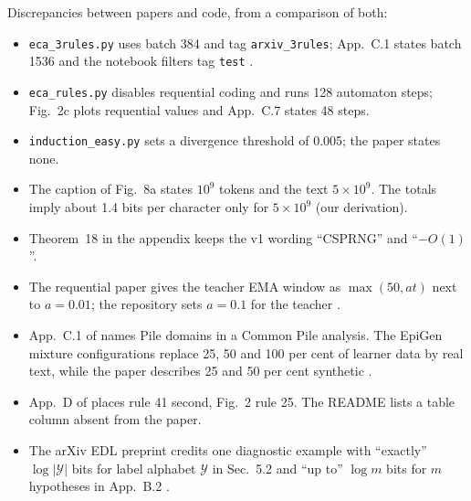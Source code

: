 \documentclass[11pt]{article}
\theoremstyle{tight}
\begin{document}
Discrepancies between papers and code, from a comparison of both:
\begin{itemize}
\item \texttt{eca\_3rules.py} uses batch 384 and tag \texttt{arxiv\_3rules}; App.~C.1 states batch
1536 and the notebook filters tag \texttt{test} \citep{epiplexitycode}.
\item \texttt{eca\_rules.py} disables requential coding and runs 128 automaton steps; Fig.~2c plots
requential values and App.~C.7 states 48 steps.
\item \texttt{induction\_easy.py} sets a divergence threshold of 0.005; the paper states none.
\item The caption of Fig.~8a states $10^9$ tokens and the text $5\times10^9$. The totals imply about
1.4 bits per character only for $5\times10^9$ (our derivation).
\item Theorem~18 in the appendix keeps the v1 wording ``CSPRNG'' and ``$-O(1)$''.
\item The requential paper gives the teacher EMA window as $\max(50,at)$ next to $a=0.01$; the
repository sets $a=0.1$ for the teacher \citep{requentialcode}.
\item App.~C.1 of \citet{su2026epiplexity} names Pile domains in a Common Pile analysis. The EpiGen
mixture configurations replace 25, 50 and 100 per cent of learner data by real text, while the paper
describes 25 and 50 per cent synthetic \citep{epigencode}.
\item App.~D of \citet{zhang2026learnablenovelty} places rule 41 second, Fig.~2 rule 25. The README
lists a table column absent from the paper.
\item The arXiv EDL preprint credits one diagnostic example with ``exactly'' $\log|\mathcal Y|$ bits
for label alphabet $\mathcal Y$ in Sec.~5.2 and ``up to'' $\log m$ bits for $m$ hypotheses in
App.~B.2 \citep{donoway2026edl}.
\end{itemize}
\end{document}
